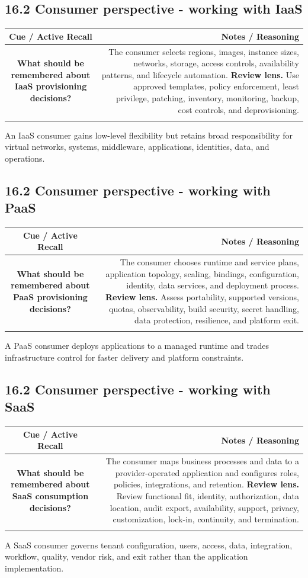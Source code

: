 \documentclass[11pt]{article}
\newcommand{\CornellHeader}{\rowcolor{Navy}\color{white}\bfseries Cue / Active Recall & \color{white}\bfseries Notes / Reasoning \\\endhead}
\newcommand{\CornellRow}[2]{\cellcolor{CueGray}\textbf{#1} & #2 \\\addlinespace[3pt]}
\begin{document}
\subsection{16.2 Consumer perspective - working with IaaS}
\begin{longtable}{@{}C N@{}}
\CornellHeader
\CornellRow{What should be remembered about IaaS provisioning decisions?}{The consumer selects regions, images, instance sizes, networks, storage, access controls, availability patterns, and lifecycle automation. \textbf{Review lens.} Use approved templates, policy enforcement, least privilege, patching, inventory, monitoring, backup, cost controls, and deprovisioning.}
\end{longtable}
\begin{sectionsummarybox}
An IaaS consumer gains low-level flexibility but retains broad responsibility for virtual networks, systems, middleware, applications, identities, data, and operations.
\end{sectionsummarybox}
\subsection{16.2 Consumer perspective - working with PaaS}
\begin{longtable}{@{}C N@{}}
\CornellHeader
\CornellRow{What should be remembered about PaaS provisioning decisions?}{The consumer chooses runtime and service plans, application topology, scaling, bindings, configuration, identity, data services, and deployment process. \textbf{Review lens.} Assess portability, supported versions, quotas, observability, build security, secret handling, data protection, resilience, and platform exit.}
\end{longtable}
\begin{sectionsummarybox}
A PaaS consumer deploys applications to a managed runtime and trades infrastructure control for faster delivery and platform constraints.
\end{sectionsummarybox}
\subsection{16.2 Consumer perspective - working with SaaS}
\begin{longtable}{@{}C N@{}}
\CornellHeader
\CornellRow{What should be remembered about SaaS consumption decisions?}{The consumer maps business processes and data to a provider-operated application and configures roles, policies, integrations, and retention. \textbf{Review lens.} Review functional fit, identity, authorization, data location, audit export, availability, support, privacy, customization, lock-in, continuity, and termination.}
\end{longtable}
\begin{sectionsummarybox}
A SaaS consumer governs tenant configuration, users, access, data, integration, workflow, quality, vendor risk, and exit rather than the application implementation.
\end{sectionsummarybox}
\end{document}
